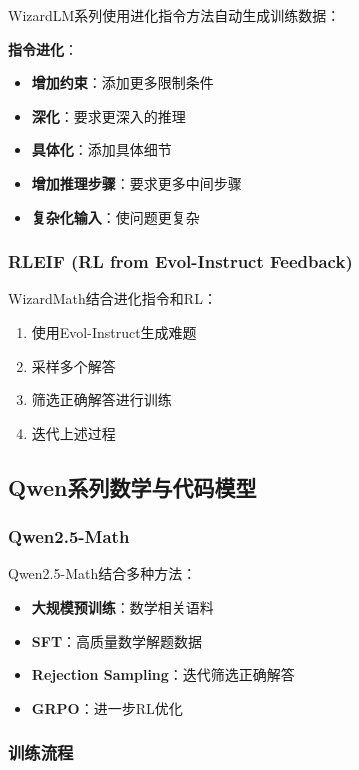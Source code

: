 \documentclass[12pt,a4paper]{article}
\begin{document}
WizardLM系列使用进化指令方法自动生成训练数据：

\textbf{指令进化}：
\begin{itemize}
    \item \textbf{增加约束}：添加更多限制条件
    \item \textbf{深化}：要求更深入的推理
    \item \textbf{具体化}：添加具体细节
    \item \textbf{增加推理步骤}：要求更多中间步骤
    \item \textbf{复杂化输入}：使问题更复杂
\end{itemize}

\subsubsection{RLEIF (RL from Evol-Instruct Feedback)}

WizardMath结合进化指令和RL：
\begin{enumerate}
    \item 使用Evol-Instruct生成难题
    \item 采样多个解答
    \item 筛选正确解答进行训练
    \item 迭代上述过程
\end{enumerate}

\subsection{Qwen系列数学与代码模型}

\subsubsection{Qwen2.5-Math}

Qwen2.5-Math结合多种方法：
\begin{itemize}
    \item \textbf{大规模预训练}：数学相关语料
    \item \textbf{SFT}：高质量数学解题数据
    \item \textbf{Rejection Sampling}：迭代筛选正确解答
    \item \textbf{GRPO}：进一步RL优化
\end{itemize}

\subsubsection{训练流程}
\end{document}
